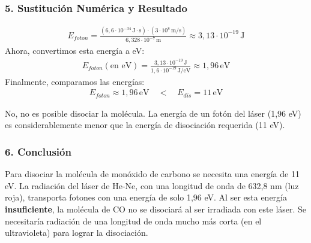 \subsubsection*{5. Sustitución Numérica y Resultado}
\begin{gather}
    E_{foton} = \frac{(6,6\cdot10^{-34} \, \text{J}\cdot\text{s}) \cdot (3\cdot10^8 \, \text{m/s})}{6,328 \cdot 10^{-7} \, \text{m}} \approx 3,13 \cdot 10^{-19} \, \text{J}
\end{gather}
Ahora, convertimos esta energía a eV:
\begin{gather}
    E_{foton} (\text{en eV}) = \frac{3,13 \cdot 10^{-19} \, \text{J}}{1,6\cdot10^{-19} \, \text{J/eV}} \approx 1,96 \, \text{eV}
\end{gather}
Finalmente, comparamos las energías:
\begin{gather}
    E_{foton} \approx 1,96 \, \text{eV} \quad < \quad E_{dis} = 11 \, \text{eV}
\end{gather}
\begin{cajaresultado}
    No, no es posible disociar la molécula. La energía de un fotón del láser (1,96 eV) es considerablemente menor que la energía de disociación requerida (11 eV).
\end{cajaresultado}

\subsubsection*{6. Conclusión}
\begin{cajaconclusion}
    Para disociar la molécula de monóxido de carbono se necesita una energía de 11 eV. La radiación del láser de He-Ne, con una longitud de onda de 632,8 nm (luz roja), transporta fotones con una energía de solo 1,96 eV. Al ser esta energía \textbf{insuficiente}, la molécula de CO no se disociará al ser irradiada con este láser. Se necesitaría radiación de una longitud de onda mucho más corta (en el ultravioleta) para lograr la disociación.
\end{cajaconclusion}

\newpage
